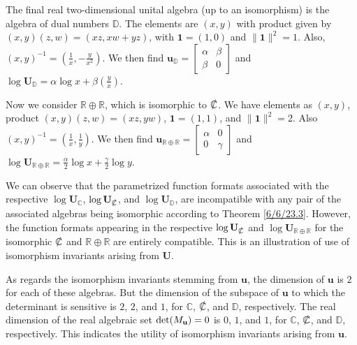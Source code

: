 \documentclass{amsart}
\numberwithin{equation}{section}
\theoremstyle{definition}
\numberwithin{theorem}{section}
\begin{document}
The final real two-dimensional unital algebra (up to an isomorphism) is the algebra of dual numbers $\mathbb{D}$.  The elements are $(x,y)$ with product given by $(x,y)(z,w) = (xz,xw+yz)$, with $\mathbf{1}=(1,0)$ and $\|\mathbf{1}\|^2 = 1$. Also, $(x,y)^{-1} = (\frac{1}{x},-\frac{y}{x^2})$.  We then find $\mathbf{u}_\mathbb{D} = \left[\begin{array}{ccc}
 \alpha & \beta   \\ 
 \beta & 0    
\end{array}\right]$ and $\log  \mathbf{U}_{\mathbb{D}} = \alpha\log x + \beta\left(\frac{y}{x}\right)$.

Now we consider $\mathbb{R}\oplus\mathbb{R}$, which is isomorphic to $\slashed{\mathbb{C}}$.  We have elements as $(x,y)$, product $(x,y)(z,w) = (xz,yw)$, $\mathbf{1}=(1,1)$, and $\|\mathbf{1}\|^2 = 2$.  Also $(x,y)^{-1} = (\frac{1}{x},\frac{1}{y})$.  We then find $\mathbf{u}_{\mathbb{R}\oplus\mathbb{R}} = \left[\begin{array}{ccc}
 \alpha & 0   \\ 
 0 & \gamma    
\end{array}\right]$ and $\log  \mathbf{U}_{\mathbb{R}\oplus\mathbb{R}} = \frac{\alpha}{2}\log x + \frac{\gamma}{2}\log y$.

We can observe that the parametrized function formats associated with the respective $\log \mathbf{U}_{\mathbb{C}}$, $\log \mathbf{U}_{\slashed{\mathbb{C}}}$, and $\log \mathbf{U}_{\mathbb{D}}$, are incompatible with any pair of the associated algebras being isomorphic according to Theorem \ref{6/6/23.3}.  However, the function formats appearing in the respective $\log \mathbf{U}_{\slashed{\mathbb{C}}}$ and $\log \mathbf{U}_{\mathbb{R}\oplus\mathbb{R}}$  for the isomorphic $\slashed{\mathbb{C}}$ and $\mathbb{R}\oplus\mathbb{R}$ are entirely compatible.  This is an illustration of use of isomorphism invariants arising from $\mathbf{U}$.

  As regards the isomorphism invariants stemming from $\mathbf{u}$, the dimension of $\mathbf{u}$ is $2$ for each of these algebras.  But the dimension of the subspace of $\mathbf{u}$ to which the determinant is sensitive is $2$, $2$, and $1$, for $\mathbb{C}$, $\slashed{\mathbb{C}}$, and $\mathbb{D}$, respectively.  The real dimension of the real algebraic set ${\rm det}(M_{\mathbf{u}}) = 0$ is $0$, $1$, and $1$, for $\mathbb{C}$, $\slashed{\mathbb{C}}$, and $\mathbb{D}$, respectively.  This indicates the utility of isomorphism invariants arising from $\mathbf{u}$. 
\end{document}
